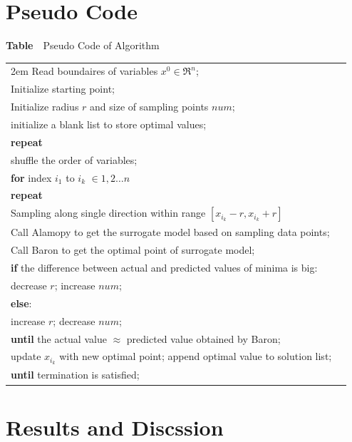\documentclass{article}
\begin{document}
\section{Pseudo Code}
\begin{center}
\textbf{Table}~~Pseudo Code of Algorithm
\begin{tabular}{lp{3cm}}
  \hline
  \hangafter=1
  \hangindent 2em
  Read boundaires of variables $x^{0}\in \Re ^{n}$;\\
  Initialize starting point;\\
  Initialize radius $r$ and size of sampling points $num$;\\
  initialize a blank list to store optimal values;\\
  \textbf{repeat}\\
  \quad shuffle the order of variables;\\
  \quad\textbf{for} index $i_{1}$ to $i_k$ $\in {1,2\dots n}$\\
  \qquad\textbf{repeat}\\
  \qquad\quad Sampling along single direction within range $[x_{i_k}-r,x_{i_k}+r]$\\
  \qquad\quad Call Alamopy to get the surrogate model based on sampling data points;\\
  \qquad\quad Call Baron to get the optimal point of surrogate model;\\
  \qquad\quad \textbf{if} the difference between actual and predicted values of minima is big:\\
  \qquad\quad\quad decrease $r$; increase $num$;\\
  \qquad\quad \textbf{else}:\\
  \qquad\quad\quad increase $r$; decrease $num$;\\
  \qquad\textbf{until} the actual value $\approx$ predicted value obtained by Baron;\\
  \qquad update $x_{i_k}$ with new optimal point; append optimal value to solution list;\\
  \textbf{until} termination is satisfied;\\
  \hline
\end{tabular}  
\end{center}

\section{Results and Discssion}

\end{document}
